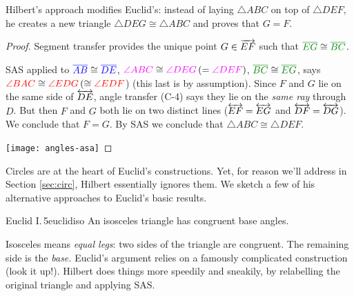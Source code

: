 
Hilbert's approach modifies Euclid's: instead of laying $\triangle ABC$ on top of $\triangle DEF$, he creates a new triangle $\triangle DEG\cong \triangle ABC$ and proves that $G=F$.

\begin{proof}
	Segment transfer provides the unique point $G\in \overrightarrow{EF}$ such that $\textcolor{Green}{\cl{EG}}\cong \textcolor{Green}{\cl{BC}}$.\par
	\begin{minipage}[t]{0.65\linewidth}\vspace{0pt}
		SAS applied to $\textcolor{blue}{\overline{AB}}\cong\textcolor{blue}{\overline{DE}}$, $\textcolor{Magenta}{\angle ABC}\cong\textcolor{Magenta}{\angle DEG}\, (=\textcolor{Magenta}{\angle DEF})$, $\textcolor{Green}{\cl{BC}}\cong \textcolor{Green}{\cl{EG}}$, says $\textcolor{red}{\angle BAC}\cong \textcolor{red}{\angle EDG}\, (\cong \textcolor{red}{\angle EDF}$) (this last is by assumption).\smallbreak
		Since $F$ and $G$ lie on the same side of $\overleftrightarrow{DE}$, angle transfer (C-4) says they lie on the \emph{same ray} through $D$.\smallbreak
		But then $F$ and $G$ both lie on two distinct lines ($\overleftrightarrow{EF}=\overleftrightarrow{EG}$ and $\overleftrightarrow{DF}=\overleftrightarrow{DG}$). We conclude that $F=G$.\smallbreak
		By SAS we conclude that $\triangle ABC\cong\triangle DEF$.
	\end{minipage}
	\hfill
	\begin{minipage}[t]{0.34\linewidth}\vspace{-28pt}
		\flushright
		\texttt{[image: angles-asa]}
	\end{minipage}
\end{proof}





Circles are at the heart of Euclid's constructions. Yet, for reason we'll address in Section \ref{sec:circ}, Hilbert essentially ignores them. We sketch a few of his alternative approaches to Euclid's basic results.

\begin{thm}{Euclid I.\,5}{euclidiso}
	An isosceles triangle has congruent base angles.
\end{thm}

Isosceles means \emph{equal legs}: two sides of the triangle are congruent. The remaining side is the \emph{base.} Euclid's argument relies on a famously complicated construction (look it up!). Hilbert does things more speedily and sneakily, by relabelling the original triangle and applying SAS.

